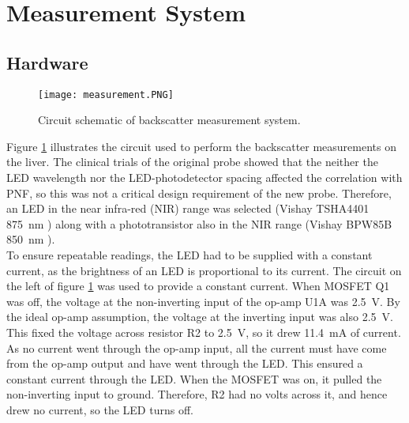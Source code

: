 \section{Measurement System}
\subsection{Hardware}

\begin{figure}[htb]
	\centering
	\texttt{[image: measurement.PNG]}
	\caption{Circuit schematic of backscatter measurement system.}
	\label{fig: measurement schematic}
\end{figure}

Figure \ref{fig: measurement schematic} illustrates the circuit used to perform the backscatter measurements on the liver. The clinical trials of the original probe showed that the neither the LED wavelength nor the LED-photodetector spacing affected the correlation with PNF, so this was not a critical design requirement of the new probe. Therefore, an LED in the near infra-red (NIR) range was selected (Vishay TSHA4401 \SI{875}{\nano\metre} \cite{tsha4401}) along with a phototransistor also in the NIR range (Vishay BPW85B \SI{850}{\nano\metre} \cite{bpw85b}).\\

To ensure repeatable readings, the LED had to be supplied with a constant current, as the brightness of an LED is proportional to its current. The circuit on the left of figure \ref{fig: measurement schematic} was used to provide a constant current. When MOSFET Q1 was off, the voltage at the non-inverting input of the op-amp U1A was \SI{2.5}{\volt}. By the ideal op-amp assumption, the voltage at the inverting input was also \SI{2.5}{\volt}. This fixed the voltage across resistor R2 to \SI{2.5}{\volt}, so it drew \SI{11.4}{\milli\ampere} of current. As no current went through the op-amp input, all the current must have come from the op-amp output and have went through the LED.  This ensured a constant current through the LED. When the MOSFET was on, it pulled the non-inverting input to ground. Therefore, R2 had no volts across it, and hence drew no current, so the LED turns off.\\

